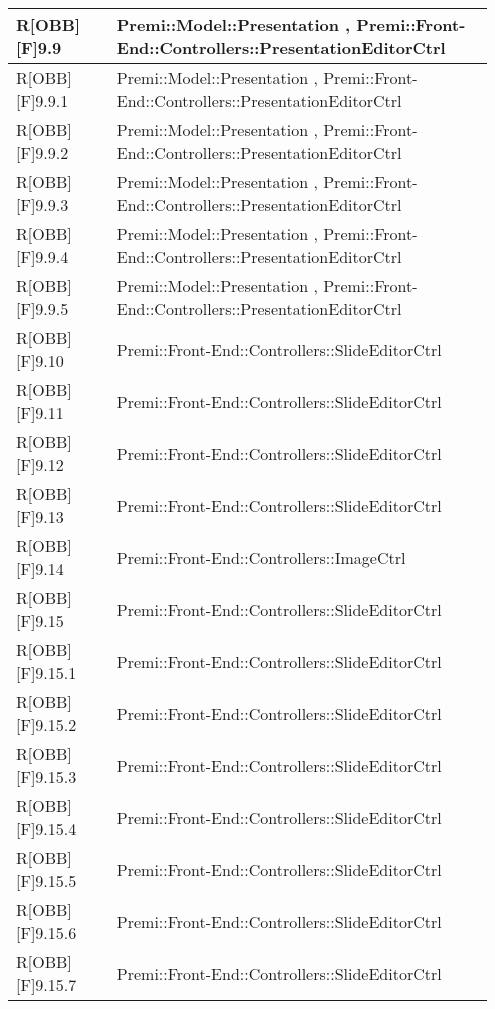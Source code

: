 \newpage
\begin{table}[h]
	\begin{center}
		\begin{tabular}{|p{0.2\linewidth}|p{0.75\linewidth}|}
			\toprule
			R[OBB][F]9.9 & Premi::Model::Presentation , Premi::Front-End::Controllers::PresentationEditorCtrl\\
		\midrule
			R[OBB][F]9.9.1 & Premi::Model::Presentation , Premi::Front-End::Controllers::PresentationEditorCtrl\\
		\midrule
			R[OBB][F]9.9.2 & Premi::Model::Presentation , Premi::Front-End::Controllers::PresentationEditorCtrl\\
		\midrule
			R[OBB][F]9.9.3 & Premi::Model::Presentation , Premi::Front-End::Controllers::PresentationEditorCtrl\\
		\midrule
			R[OBB][F]9.9.4 & Premi::Model::Presentation , Premi::Front-End::Controllers::PresentationEditorCtrl\\
		\midrule
			R[OBB][F]9.9.5 & Premi::Model::Presentation , Premi::Front-End::Controllers::PresentationEditorCtrl\\
		\midrule
			R[OBB][F]9.10 & Premi::Front-End::Controllers::SlideEditorCtrl\\
		\midrule
			R[OBB][F]9.11 & Premi::Front-End::Controllers::SlideEditorCtrl\\
		\midrule
			R[OBB][F]9.12 & Premi::Front-End::Controllers::SlideEditorCtrl\\
		\midrule
			R[OBB][F]9.13 & Premi::Front-End::Controllers::SlideEditorCtrl\\
		\midrule
			R[OBB][F]9.14 & Premi::Front-End::Controllers::ImageCtrl\\
		\midrule
			R[OBB][F]9.15 & Premi::Front-End::Controllers::SlideEditorCtrl\\
		\midrule
			R[OBB][F]9.15.1 & Premi::Front-End::Controllers::SlideEditorCtrl\\
		\midrule
			R[OBB][F]9.15.2 & Premi::Front-End::Controllers::SlideEditorCtrl\\
		\midrule
			R[OBB][F]9.15.3 & Premi::Front-End::Controllers::SlideEditorCtrl\\
		\midrule
			R[OBB][F]9.15.4 & Premi::Front-End::Controllers::SlideEditorCtrl\\
		\midrule
			R[OBB][F]9.15.5 & Premi::Front-End::Controllers::SlideEditorCtrl\\
		\midrule
			R[OBB][F]9.15.6 & Premi::Front-End::Controllers::SlideEditorCtrl\\
		\midrule
			R[OBB][F]9.15.7 & Premi::Front-End::Controllers::SlideEditorCtrl\\

\end{tabular}
\end{center}
\end{table}
